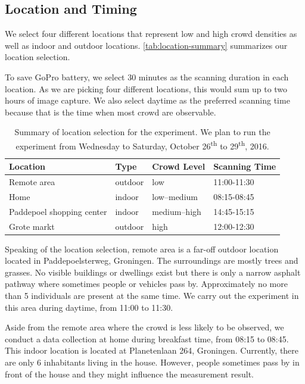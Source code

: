 \subsection{Location and Timing} %
\label{sub:location_and_timing}
We select four different locations that represent low and high crowd densities as well as indoor and outdoor locations. \autoref{tab:location-summary} summarizes our location selection.

To save GoPro battery, we select 30 minutes as the scanning duration in each location. As we are picking four different locations, this would sum up to two hours of image capture. We also select daytime as the preferred scanning time because that is the time when most crowd are observable.

\begin{table}[]
\centering
\caption[Summary of location selection]
{Summary of location selection for the experiment. We plan to run the experiment from Wednesday to Saturday, October 26\textsuperscript{th} to 29\textsuperscript{th}, 2016.}
\label{tab:location-summary}
\begin{tabular}{llll} \toprule
Location                  & Type    & Crowd Level & Scanning Time \\ \midrule
Remote area               & outdoor & low         & 11:00-11:30   \\
Home                      & indoor  & low--medium  & 08:15-08:45   \\
Paddepoel shopping center & indoor  & medium--high & 14:45-15:15   \\
Grote markt               & outdoor & high        & 12:00-12:30  \\ \bottomrule
\end{tabular}
\end{table}


Speaking of the location selection, remote area is a far-off outdoor location located in Paddepoelsterweg, Groningen. The surroundings are mostly trees and grasses. No visible buildings or dwellings exist but there is only a narrow asphalt pathway where sometimes people or vehicles pass by. Approximately no more than 5 individuals are present at the same time. We carry out the experiment in this area during daytime, from 11:00 to 11:30.

Aside from the remote area where the crowd is less likely to be observed, we conduct a data collection at home during breakfast time, from 08:15 to 08:45. This indoor location is located at Planetenlaan 264, Groningen. Currently, there are only 6 inhabitants living in the house. However, people sometimes pass by in front of the house and they might influence the measurement result.

